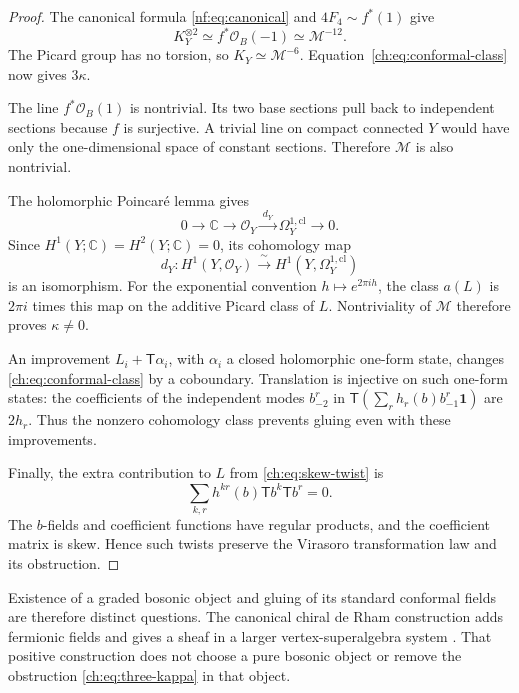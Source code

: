 \begin{proof}
The canonical formula \eqref{nf:eq:canonical} and
$4F_4\sim f^*(1)$ give
\[
             K_Y^{\otimes2}\simeq f^*\mathcal O_B(-1)
                               \simeq\mathcal M^{-12}.
\]
The Picard group has no torsion, so $K_Y\simeq\mathcal M^{-6}$.
Equation~\eqref{ch:eq:conformal-class} now gives $3\kappa$.

The line $f^*\mathcal O_B(1)$ is nontrivial.
Its two base sections pull back to independent sections because
$f$ is surjective. A trivial line on compact connected $Y$
would have only the one-dimensional space of constant sections.
Therefore $\mathcal M$ is also nontrivial.

The holomorphic Poincar\'e lemma gives
\[
       0\longrightarrow\mathbb C\longrightarrow\mathcal O_Y
          \xrightarrow{\ d_Y\ }\Omega_Y^{1,\mathrm{cl}}
          \longrightarrow0.
\]
Since $H^1(Y;\mathbb C)=H^2(Y;\mathbb C)=0$, its cohomology
map
\[
       d_Y:H^1(Y,\mathcal O_Y)
                 \xrightarrow{\ \sim\ }H^1(Y,\Omega_Y^{1,\mathrm{cl}})
\]
is an isomorphism.
For the exponential convention $h\mapsto e^{2\pi i h}$,
the class $a(L)$ is $2\pi i$ times this map on the additive
Picard class of $L$. Nontriviality of $\mathcal M$ therefore
proves $\kappa\ne0$.

An improvement $L_i+\mathsf T\alpha_i$, with $\alpha_i$ a
closed holomorphic one-form state, changes
\eqref{ch:eq:conformal-class} by a coboundary.
Translation is injective on such one-form states:
the coefficients of the independent modes $b^r_{-2}$ in
$\mathsf T(\sum_r h_r(b)b^r_{-1}\mathbf1)$ are $2h_r$.
Thus the nonzero cohomology class prevents gluing even with
these improvements.

Finally, the extra contribution to $L$ from
\eqref{ch:eq:skew-twist} is
\[
                   \sum_{k,r}h^{kr}(b)\mathsf T b^k\mathsf T b^r=0.
\]
The $b$-fields and coefficient functions have regular products,
and the coefficient matrix is skew.
Hence such twists preserve the Virasoro transformation law and
its obstruction.
\end{proof}

Existence of a graded bosonic object and gluing of its standard
conformal fields are therefore distinct questions.
The canonical chiral de Rham construction adds fermionic fields
and gives a sheaf in a larger vertex-superalgebra system
\cite[Section~8]{GMSGerbes}.
That positive construction does not choose a pure bosonic object
or remove the obstruction \eqref{ch:eq:three-kappa} in that object.

